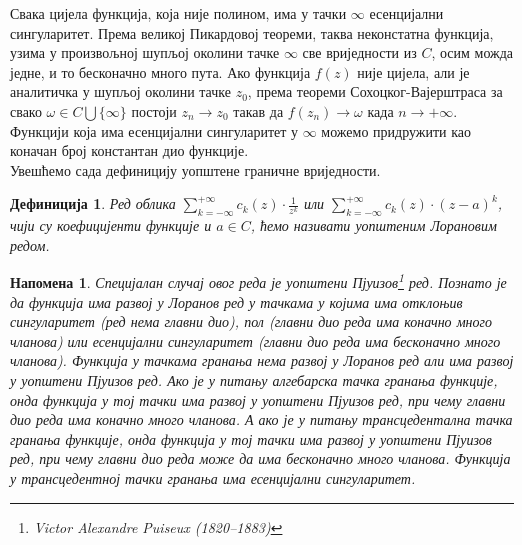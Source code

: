 \documentclass[12pt]{article}
\newtheorem{definition}{Дефиниција}
\newtheorem{remark}{Напомена}
\begin{document}
Свака цијела функција, која није полином, има у тачки $\infty$ есенцијални сингуларитет. Према великој Пикардовој теореми, таква неконстатна функција, узима у произвољној шупљој околини тачке $\infty$ све вриједности из $C$, осим можда једне, и то бесконачно много пута. Ако функција $f(z)$ није цијела, али је аналитичка у шупљој околини тачке $z_0$, према теореми Сохоцког-Вајерштраса за свако $\omega\in C\bigcup\{\infty\}$ постоји $z_n\to z_0$ такав да $f(z_n)\to\omega$ када $n\to+\infty$. Функцији која има есенцијални сингуларитет у $\infty$ можемо придружити као коначан број константан дио функције.
\\Увешћемо сада дефиницију уопштене граничне вриједности.\\

\begin{definition}
Ред облика $\sum_{k=-\infty}^{+\infty}c_k(z)\cdot \frac{1}{z^k}$ или $\sum_{k=-\infty}^{+\infty}c_k(z)\cdot (z-a)^k$, чији су коефицијенти функције и $a\in C$, ћемо називати уопштеним Лорановим редом.
\end{definition}

\begin{remark}
Специјалан случај овог реда је уопштени Пјуизов\footnote{Victor Alexandre Puiseux (1820–1883)} ред. Познато је да функција има развој у Лоранов ред у тачкама у којима има отклоњив сингуларитет (ред нема главни дио), пол (главни дио реда има коначно много чланова) или есенцијални сингуларитет (главни дио реда има бесконачно много чланова).  Функција у тачкама гранања нема развој у Лоранов ред али има развој у уопштени Пјуизов ред. Ако је у питању алгебарска тачка гранања функције, онда функција у тој тачки има развој у уопштени Пјуизов ред, при чему главни дио реда има коначно много чланова. А ако је у питању трансцедентална тачка гранања функције, онда функција у тој тачки има развој у уопштени Пјуизов ред, при чему главни дио реда може да има бесконачно много чланова. Функција у трансцедентној тачки гранања има есенцијални сингуларитет.
\end{remark}
\end{document}

